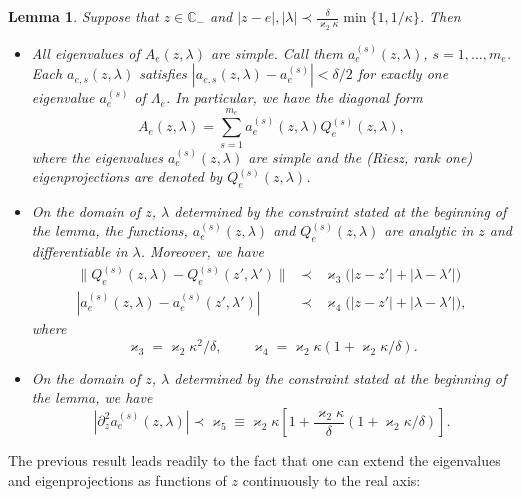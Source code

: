 \documentclass[letterpaper,onecolumn,11pt,accepted=2021-12-09]{quantumarticle}
\numberwithin{equation}{section}
\newcounter{resultcounter}[section]
\newtheorem{lem}[resultcounter]{Lemma}
\newcommand{\aes}{a_e^{(s)}}
\newcommand{\Qes}{Q_e^{(s)}}
\begin{document}
\begin{lem} 
\label{lem2.4}
Suppose that $z\in{\mathbb C}_-$ and $|z-e|, |\lambda| \prec \frac{\delta}{\varkappa_2\kappa} \min\{1,1/\kappa\}$. Then 
\begin{itemize}
\item[{\rm 1.}] All eigenvalues of $A_e(z,\lambda)$ are simple. Call them $\aes(z,\lambda)$, $s=1,\ldots, m_e$. Each $a_{e,s}(z,\lambda)$ satisfies $|a_{e,s}(z,\lambda)-\aes|<\delta/2$ for exactly one eigenvalue $\aes$ of $\Lambda_e$. In particular, we have the diagonal form 
\begin{equation}
A_e(z,\lambda)  = \sum_{s=1}^{m_e} \aes(z,\lambda) \Qes(z,\lambda),
\label{89}
\end{equation}
		where the eigenvalues $\aes(z,\lambda)$ are simple and the (Riesz, rank one) eigenprojections are denoted by $\Qes(z,\lambda)$.
		
\item[2.] On the domain of $z$, $\lambda$ determined by the constraint stated at the beginning of the lemma, the functions, $\aes(z,\lambda)$ and $\Qes(z,\lambda)$ are analytic in $z$ and differentiable in $\lambda$. Moreover, we have 
\begin{eqnarray}
\big\| \Qes(z,\lambda)-\Qes(z',\lambda')\big\| &\prec&  \varkappa_3 \big(|z-z'|+|\lambda-\lambda'| \big) \label{119.0}\\
|\aes(z,\lambda) -\aes(z',\lambda')|
&\prec&  \varkappa_4 \big(|z-z'| +|\lambda-\lambda'| \big),
\label{119.1}
\end{eqnarray}
where 
\begin{equation}
\varkappa_3=\varkappa_2\kappa^2/ \delta,\qquad \varkappa_4=\varkappa_2\kappa (1+\varkappa_2\kappa/\delta).
\label{kappa3,4} 
\end{equation}



\item[3.] On the domain of $z$, $\lambda$ determined by the constraint stated at the beginning of the lemma, we have 
\begin{equation}
| \partial_z ^2\aes(z,\lambda)|\prec \varkappa_5\equiv \varkappa_2\kappa[1+ \frac{\varkappa_2\kappa}{\delta} (1+\varkappa_2\kappa/\delta)].
\label{kappa5}
\end{equation} 
\end{itemize}
\end{lem}

The previous result leads readily to the fact that one can extend the eigenvalues and eigenprojections as functions of $z$ continuously to the real axis: 
\end{document}
